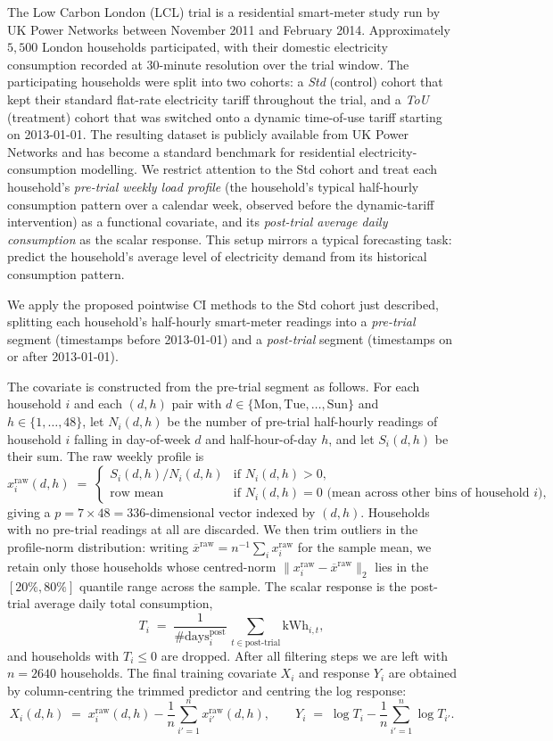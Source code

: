 \documentclass[11pt,a4paper]{article}
\renewcommand{\bar}{\overline}
\theoremstyle{definition}
\theoremstyle{plain}
\theoremstyle{remark}
\begin{document}
The Low Carbon London (LCL) trial is a residential smart-meter study run by UK Power Networks between November 2011 and February 2014. Approximately $5{,}500$ London households participated, with their domestic electricity consumption recorded at $30$-minute resolution over the trial window. The participating households were split into two cohorts: a \emph{Std} (control) cohort that kept their standard flat-rate electricity tariff throughout the trial, and a \emph{ToU} (treatment) cohort that was switched onto a dynamic time-of-use tariff starting on 2013-01-01. The resulting dataset is publicly available from UK Power Networks and has become a standard benchmark for residential electricity-consumption modelling. We restrict attention to the Std cohort and treat each household's \emph{pre-trial weekly load profile} (the household's typical half-hourly consumption pattern over a calendar week, observed before the dynamic-tariff intervention) as a functional covariate, and its \emph{post-trial average daily consumption} as the scalar response. This setup mirrors a typical forecasting task: predict the household's average level of electricity demand from its historical consumption pattern.

We apply the proposed pointwise CI methods to the Std cohort just described, splitting each household's half-hourly smart-meter readings into a \emph{pre-trial} segment (timestamps before 2013-01-01) and a \emph{post-trial} segment (timestamps on or after 2013-01-01).

The covariate is constructed from the pre-trial segment as follows. For each household $i$ and each $(d, h)$ pair with $d \in \{\text{Mon},\text{Tue},\ldots,\text{Sun}\}$ and $h \in \{1,\ldots,48\}$, let $N_i(d,h)$ be the number of pre-trial half-hourly readings of household $i$ falling in day-of-week $d$ and half-hour-of-day $h$, and let $S_i(d,h)$ be their sum. The raw weekly profile is
\[
x_i^{\text{raw}}(d, h) \;=\; \begin{cases} S_i(d,h)/N_i(d,h) & \text{if } N_i(d,h) > 0,\\ \text{row mean} & \text{if } N_i(d,h)=0 \text{ (mean across other bins of household } i\text{)}, \end{cases}
\]
giving a $p = 7 \times 48 = 336$-dimensional vector indexed by $(d, h)$. Households with no pre-trial readings at all are discarded. We then trim outliers in the profile-norm distribution: writing $\bar x^{\text{raw}} = n^{-1}\sum_i x_i^{\text{raw}}$ for the sample mean, we retain only those households whose centred-norm $\|x_i^{\text{raw}} - \bar x^{\text{raw}}\|_2$ lies in the $[20\%, 80\%]$ quantile range across the sample. The scalar response is the post-trial average daily total consumption,
\[
T_i \;=\; \frac{1}{\#\text{days}_i^{\text{post}}}\,\sum_{t \in \text{post-trial}} \text{kWh}_{i,t},
\]
and households with $T_i \le 0$ are dropped. After all filtering steps we are left with $n = 2640$ households. The final training covariate $X_i$ and response $Y_i$ are obtained by column-centring the trimmed predictor and centring the log response:
\[
X_i(d, h) \;=\; x_i^{\text{raw}}(d, h) - \frac{1}{n}\sum_{i'=1}^{n} x_{i'}^{\text{raw}}(d, h),
\qquad
Y_i \;=\; \log T_i - \frac{1}{n}\sum_{i'=1}^n \log T_{i'}.
\]
\end{document}
